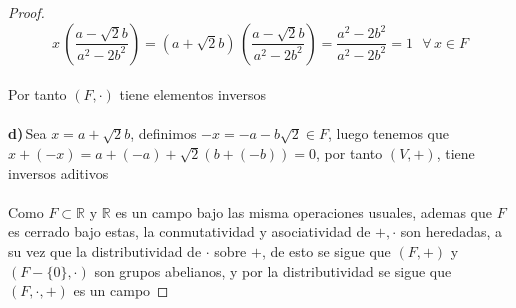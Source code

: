 \documentclass[11pt,letterpaper]{article}
\newcommand{\R}{\mathbb{R}}
\begin{document}
\begin{proof}
	\begin{equation*}
		x\,\left(\frac{a-\sqrt{2}b}{a^2-2b^2}\right)=(a+\sqrt{2}b)\,\left(\frac{a-\sqrt{2}b}{a^2-2b^2}\right)=\frac{a^2-2b^2}{a^2-2b^2}=1\,\,\,\,\forall\,x\in F
	\end{equation*}\,\\
	Por tanto $(F,\cdot)$ tiene elementos inversos\,\\
	\,\\
	\textbf{d)}\,Sea $x=a+\sqrt{2}b$, definimos $-x=-a-b\sqrt{2}\in F$, luego tenemos que $x+(-x)=a+(-a)+\sqrt{2}(b+(-b))=0$, por tanto
	$(V,+)$, tiene inversos aditivos\,\\
	\,\\
	Como $F\subset \R$ y $\R$ es un campo bajo las misma operaciones usuales, ademas que $F$ es cerrado bajo estas, la conmutatividad y asociatividad de $+,\cdot$ son heredadas,
	a su vez que la distributividad de $\cdot$ sobre $+$, de esto se sigue que $(F,+)$ y $(F-\{0\},\cdot)$ son grupos abelianos, 
	y por la distributividad se sigue que $(F,\cdot,+)$ es un campo
\end{proof}\,\\
\end{document}
